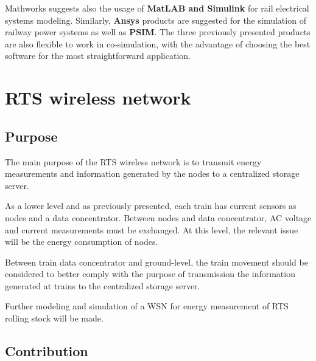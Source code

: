 Mathworks suggests also the usage of \textbf{MatLAB and Simulink} for rail electrical systems modeling. 
Similarly, \textbf{Ansys} products are suggested for the simulation of railway power systems as well as \textbf{PSIM}. The three previously presented products are also flexible to work in co-simulation, with the advantage of choosing the best software for the most straightforward application.


\section{RTS wireless network}
\label{sec:43}

\subsection{Purpose}

The main purpose of the RTS wireless network is to transmit energy measurements and information generated by the nodes to a centralized storage server. 

As a lower level and as previously presented, each train has current sensors as nodes and a data concentrator. Between nodes and data concentrator, AC voltage and current measurements must be exchanged.
At this level, the relevant issue will be the energy consumption of nodes.

Between train data concentrator and ground-level, the train movement should be considered to better comply with the purpose of transmission the information generated at trains to the centralized storage server. 

Further modeling and simulation of a WSN for energy measurement of RTS rolling stock will be made.

\subsection{Contribution}


